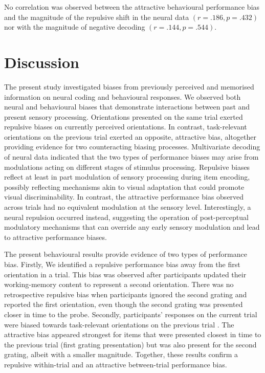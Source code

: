 \documentclass{article}
\begin{document}
\begin{large}
No correlation was observed between the attractive behavioural performance bias and the magnitude of the repulsive shift in the neural data $(r = .186, p = .432)$ nor with the magnitude of negative decoding $(r = .144, p = .544)$.


\section{Discussion}
The present study investigated biases from previously perceived and memorised information on neural coding and behavioural responses. We observed both neural and behavioural biases that demonstrate interactions between past and present sensory processing. Orientations presented on the same trial exerted repulsive biases on currently perceived orientations. In contrast, task-relevant orientations on the previous trial exerted an opposite, attractive bias, altogether providing evidence for two counteracting biasing processes. Multivariate decoding of neural data indicated that the two types of performance biases may arise from modulations acting on different stages of stimulus processing. Repulsive biases reflect at least in part modulation of sensory processing during item encoding, possibly reflecting mechanisms akin to visual adaptation that could promote visual discriminability. In contrast, the attractive performance bias observed across trials had no equivalent modulation at the sensory level. Interestingly, a neural repulsion occurred instead, suggesting the operation of post-perceptual modulatory mechanisms that can override any early sensory modulation and lead to attractive performance biases.


The present behavioural results provide evidence of two types of performance bias. Firstly, We identified a repulsive performance bias away from the first orientation in a trial. This bias was observed after participants updated their working-memory content to represent a second orientation. There was no retrospective repulsive bias when participants ignored the second grating and reported the first orientation, even though the second grating was presented closer in time to the probe. Secondly, participants’ responses on the current trial were biased towards task-relevant orientations on the previous trial \parencite[c.f., ][]{Bae2020, Fischer2020}. The attractive bias appeared strongest for items that were presented closest in time to the previous trial (first grating presentation) but was also present for the second grating, albeit with a smaller magnitude. Together, these results confirm a repulsive within-trial and an attractive between-trial performance bias.


\end{large}
\end{document}
